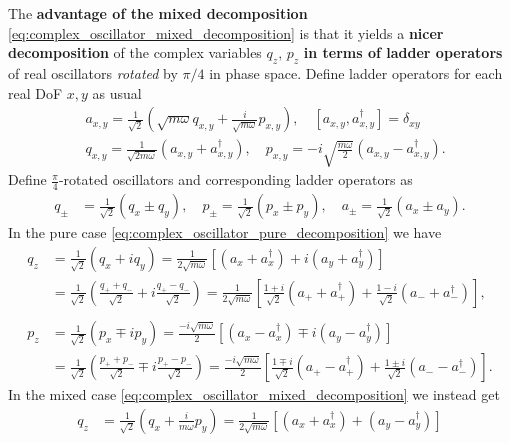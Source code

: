\documentclass[../QFT_main.tex]{subfiles}
\begin{document}
\begin{mytheorem}
The \textbf{advantage of the mixed decomposition} \eqref{eq:complex_oscillator_mixed_decomposition} is that it yields a \textbf{nicer decomposition} of the complex variables $q_z,\,p_z$ \textbf{in terms of ladder operators} of real oscillators \emph{rotated} by $\pi/4$ in phase space.
Define ladder operators for each real DoF $x,y$ as usual
\begin{align}
    &a_{x,y}= \frac{1}{\sqrt{2}}\left(\sqrt{m\omega} q_{x,y} + \frac{i}{\sqrt{m\omega}} p_{x,y}\right),  \quad [a_{x,y}, a_{x,y}^\dagger] = \delta_{xy}\,\\
    &  q_{x,y}= \frac{1}{\sqrt{2 m \omega}} (a_{x,y} + a_{x,y}^\dagger), \quad p_{x,y} = -i \sqrt{\frac{m \omega}{2}} (a_{x,y} - a_{x,y}^\dagger).
\end{align}
Define $\tfrac{\pi}{4}$-rotated oscillators and corresponding ladder operators as
\begin{align}
    q_\pm &= \frac{1}{\sqrt{2}}(q_x \pm q_y), \quad p_\pm = \frac{1}{\sqrt{2}}(p_x \pm p_y),\quad a_\pm = \frac{1}{\sqrt{2}}(a_x \pm a_y).
\end{align}
In the pure case \eqref{eq:complex_oscillator_pure_decomposition} we have
\begin{align}
    q_z &= \frac{1}{\sqrt{2}}(q_x + i q_y) = \frac{1}{2\sqrt{m\omega}}\left[(a_x + a_x^\dagger) + i (a_y + a_y^\dagger)\right]\\
    &=  \frac{1}{\sqrt{2}}\left(\frac{q_+ + q_-}{\sqrt{2}} + i \frac{q_+ - q_-}{\sqrt{2}}\right) = \frac{1}{2\sqrt{m\omega}}\left[\tfrac{1+i}{\sqrt{2}}(a_++a_+^\dagger)+ \tfrac{1-i}{\sqrt{2}}(a_-+a_-^\dagger)\right],\\
    \\
    p_z &= \frac{1}{\sqrt{2}}(p_x \mp i p_y) = \frac{-i\sqrt{m\omega}}{2}\left[(a_x - a_x^\dagger) \mp i (a_y - a_y^\dagger)\right]
    \\
    &= \frac{1}{\sqrt{2}}\left(\frac{p_+ + p_-}{\sqrt{2}} \mp i \frac{p_+ - p_-}{\sqrt{2}}\right) = \frac{-i\sqrt{m\omega}}{2}\left[\tfrac{1\mp i}{\sqrt{2}}(a_+-a_+^\dagger)+ \tfrac{1\pm i}{\sqrt{2}}(a_- - a_-^\dagger)\right].
\end{align}
In the mixed case \eqref{eq:complex_oscillator_mixed_decomposition} we instead get
\begin{align}\label{eq:complex_oscillator_rotated_mixed_decomposition}
    q_z &= \frac{1}{\sqrt{2}}\left(q_x + \tfrac{i}{m\omega} p_y\right) = \frac{1}{2\sqrt{m\omega}}\left[(a_x + a_x^\dagger) + (a_y - a_y^\dagger)\right]\\

\end{align}
\end{mytheorem}
\end{document}
